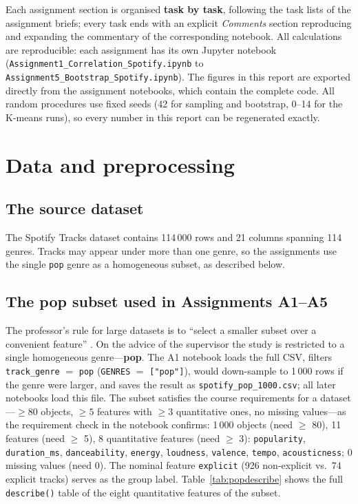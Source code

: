 \documentclass[11pt,letterpaper]{article}
\begin{document}
Each assignment section is organised \textbf{task by task}, following the
task lists of the assignment briefs; every task ends with an explicit
\emph{Comments} section reproducing and expanding the commentary of the
corresponding notebook. All calculations are reproducible: each assignment has
its own Jupyter notebook
(\nolinkurl{Assignment1_Correlation_Spotify.ipynb} to
\nolinkurl{Assignment5_Bootstrap_Spotify.ipynb}). The figures in this report
are exported directly from the assignment notebooks, which contain the
complete code. All random procedures use fixed seeds (42 for sampling and
bootstrap, 0--14 for the K-means runs), so every number in this report can be
regenerated exactly.

\section{Data and preprocessing}\label{sec:data}

\subsection{The source dataset}\label{sec:rawdata}

The Spotify Tracks dataset \citep{spotify} contains 114\,000 rows and 21
columns spanning 114 genres. Tracks may appear under more than one genre, so
the assignments use the single \texttt{pop} genre as a homogeneous subset,
as described below.

\subsection{The pop subset used in Assignments A1--A5}\label{sec:popsub}

The professor's rule for large datasets is to ``select a smaller subset over a
convenient feature'' \citep{course}. On the advice of the supervisor the study
is restricted to a single homogeneous genre---\textbf{pop}. The A1 notebook
loads the full CSV, filters \texttt{track\_genre} $=$ \texttt{pop}
(\nolinkurl{GENRES} $=$ \texttt{["pop"]}), would down-sample to 1\,000 rows if
the genre were larger, and saves the result as
\texttt{spotify\_pop\_1000.csv}; all later notebooks load this file. The
subset satisfies the course requirements for a dataset---$\ge 80$ objects,
$\ge 5$ features with $\ge 3$ quantitative ones, no missing values---as the
requirement check in the notebook confirms: 1\,000 objects (need $\ge$ 80),
11 features (need $\ge$ 5), 8 quantitative features (need $\ge$ 3):
\texttt{popularity}, \texttt{duration\_ms}, \texttt{danceability},
\texttt{energy}, \texttt{loudness}, \texttt{valence}, \texttt{tempo},
\texttt{acousticness}; 0 missing values (need 0). The nominal feature
\texttt{explicit} (926 non-explicit vs.\ 74 explicit tracks) serves as the
group label. Table~\ref{tab:popdescribe} shows the full \texttt{describe()}
table of the eight quantitative features of the subset.
\end{document}
